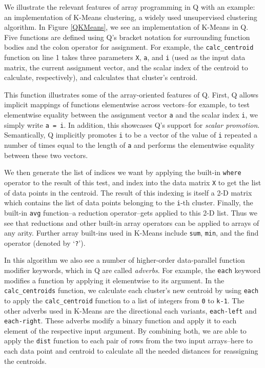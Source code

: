 \documentclass[preprint]{sigplanconf}
\begin{document}
We illustrate the relevant features of array programming in Q with an example:
an implementation of K-Means clustering, a widely used unsupervised
clustering algorithm.  In Figure \ref{QKMeans}, we see an
implementation of K-Means in Q.  Five functions are defined using Q's bracket
notation for surrounding function bodies and the colon operator for assignment.
For example, the
\texttt{calc\_centroid} function on line 1 takes three parameters
\texttt{X}, \texttt{a}, and \texttt{i} (used as the input data matrix, the
current assignment vector, and the scalar index of the centroid to calculate,
respectively), and calculates that cluster's centroid.

This function illustrates some of the array-oriented features of
Q. First, Q allows implicit mappings of functions elementwise across
vectors--for example, to test elementwise equality between the assignment
vector \texttt{a} and the scalar
index \texttt{i}, we simply write \texttt{a = i}.  In
addition, this showcases Q's support for \emph{scalar promotion}.  
Semantically, Q implicitly promotes \texttt{i} to be a vector
of the value of \texttt{i} repeated a number of times equal to the length of
\texttt{a} and performs the elementwise equality between these two vectors.

We then generate the list of indices we want by applying the built-in
\texttt{where} operator to the result of this test, and index into the data
matrix \texttt{X} to get the list of data points in the centroid. The result of
this indexing is itself a 2-D matrix which contains the list of data points
belonging to the \texttt{i}-th cluster. Finally, the built-in \texttt{avg}
function--a reduction operator--gets applied to this 2-D list. Thus we see that
reductions and other built-in array operators can be applied to arrays of any
arity.  Further array built-ins used in K-Means include \texttt{sum},
\texttt{min}, and the find operator (denoted by `\texttt{?}').

In this algorithm we also see a number of higher-order data-parallel function
modifier keywords, which in Q are called \emph{adverbs}.  For example, the
\texttt{each} keyword modifies a function by applying it elementwise to its
argument.  In the \texttt{calc\_centroids} function, we calculate each cluster's
new centroid
by using \texttt{each} to apply the \texttt{calc\_centroid} function to a
list of integers from \texttt{0} to \texttt{k-1}.  The other adverbs used in
K-Means are the directional each variants, \texttt{each-left} and \texttt{each-right}. These adverbs modify a binary function and apply it to each element of the respective input argument.  By combining both, we are able to apply the \texttt{dist} function to each pair of rows from the two input arrays--here to each data point and centroid to calculate all the needed distances for reassigning the centroids.
\end{document}
